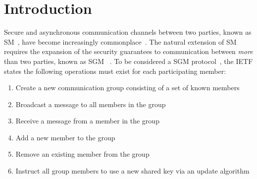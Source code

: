 \documentclass[authordraft,sigconf]{acmart}
\newcommand{\Abrev}[1]{\gls{#1}}
\begin{document}
\maketitle


%
%
%

%
%



\section{Introduction}

Secure and asynchronous communication channels between two parties, known as \Abrev{SM}~\cite{unger2015sok}, have become increasingly commonplace~\cite{schroder2016signal,vaziripour2017you,jahn2018usability}.
The natural extension of \Abrev{SM} requires the expansion of the security guarantees to communication between \emph{more} than two parties, known as \Abrev{SGM} ~\cite{cohn2018ends}.
To be considered a \Abrev{SGM} protocol~\cite{ietf-mls-protocol-14}, the \Abrev{IETF} states the following operations must exist for each participating member:

\begin{enumerate}
\item Create a new communication group consisting of a set of known members
\item Broadcast a message to all members in the group
\item Receive a message from a member in the group
\item Add a new member to the group
\item Remove an existing member from the group
\item Instruct all group members to use a new shared key via an update algorithm
\end{enumerate}
\end{document}
